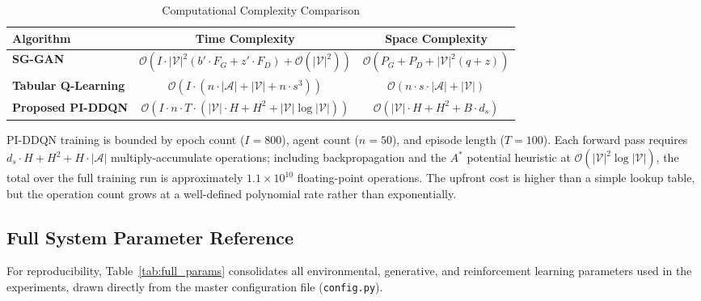 \documentclass[conference]{IEEEtran}
\begin{document}
\begin{table}[t!]
\centering
\caption{Computational Complexity Comparison}
\label{tab:computational_complexity}
\renewcommand{\arraystretch}{1.3}
\setlength{\tabcolsep}{8pt}
\small
\begin{tabular}{|l|c|c|}
\hline
\textbf{Algorithm} & \textbf{Time Complexity} & \textbf{Space Complexity} \\ \hline
\textbf{SG-GAN} & $\mathcal{O}\left(I \cdot |\mathcal{V}|^2 (b' \cdot F_G + z' \cdot F_D) + \mathcal{O}(|\mathcal{V}|^2)\right)$ & $\mathcal{O}\left(P_G + P_D + |\mathcal{V}|^2(q+z)\right)$ \\ \hline
\textbf{Tabular Q-Learning} & $\mathcal{O}\left(I \cdot (n \cdot |\mathcal{A}| + |\mathcal{V}| + n \cdot s^3)\right)$ & $\mathcal{O}\left(n \cdot s \cdot |\mathcal{A}| + |\mathcal{V}|\right)$ \\ \hline
\textbf{Proposed PI-DDQN} & $\mathcal{O}\left(I \cdot n \cdot T \cdot (|\mathcal{V}| \cdot H + H^2 + |\mathcal{V}| \log |\mathcal{V}|)\right)$ & $\mathcal{O}\left(|\mathcal{V}| \cdot H + H^2 + B \cdot d_s\right)$ \\ \hline
\end{tabular}
\end{table}

PI-DDQN training is bounded by epoch count ($I = 800$), agent count ($n = 50$), and episode length ($T = 100$). Each forward pass requires $d_s \cdot H + H^2 + H \cdot |\mathcal{A}|$ multiply-accumulate operations; including backpropagation and the $A^*$ potential heuristic at $\mathcal{O}(|\mathcal{V}|^2 \log |\mathcal{V}|)$, the total over the full training run is approximately $1.1 \times 10^{10}$ floating-point operations. The upfront cost is higher than a simple lookup table, but the operation count grows at a well-defined polynomial rate rather than exponentially.

\subsection{Full System Parameter Reference}
For reproducibility, Table~\ref{tab:full_params} consolidates all environmental, generative, and reinforcement learning parameters used in the experiments, drawn directly from the master configuration file (\texttt{config.py}).
\end{document}
